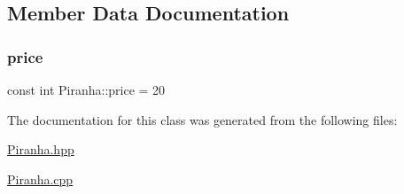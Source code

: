 \subsection{Member Data Documentation}
\mbox{\label{class_piranha_a5cab361b7ab7133245dc8a54a1d8addb}} 
\subsubsection{\texorpdfstring{price}{price}}
{\footnotesize\ttfamily const int Piranha\+::price = 20\hspace{0.3cm}{\ttfamily [static]}}



The documentation for this class was generated from the following files\+:\begin{DoxyCompactItemize}
\item 
\mbox{\hyperlink{_piranha_8hpp}{Piranha.\+hpp}}\item 
\mbox{\hyperlink{_piranha_8cpp}{Piranha.\+cpp}}\end{DoxyCompactItemize}
